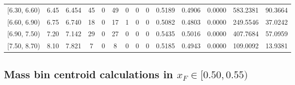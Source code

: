 \begin{table}[htbp]
{\begin{tabular}{cc|c|cccccc|ccc|cc}
        {[6.30, 6.60)} & 6.45 & 6.454 & 45 & 0 & 49 & 0 & 0 & 0 & 0.5189 & 0.4906 & 0.0000 & 583.2381 & 90.3664 \\
        {[6.60, 6.90)} & 6.75 & 6.740 & 18 & 0 & 17 & 1 & 0 & 0 & 0.5082 & 0.4803 & 0.0000 & 249.5546 & 37.0242 \\
        {[6.90, 7.50)} & 7.20 & 7.142 & 29 & 0 & 27 & 0 & 0 & 0 & 0.5435 & 0.5016 & 0.0000 & 407.7684 & 57.0959 \\
        {[7.50, 8.70)} & 8.10 & 7.821 & 7 & 0 & 8 & 0 & 0 & 0 & 0.5185 & 0.4943 & 0.0000 & 109.0092 & 13.9381 \\
        \hline\hline
    \end{tabular}
    }
\end{table}

\clearpage
\subsection{\texorpdfstring{Mass bin centroid calculations in $x_F \in [0.50, 0.55)$}{Mass bin centroid calculations in x\_F in [0.50, 0.55)]}}

